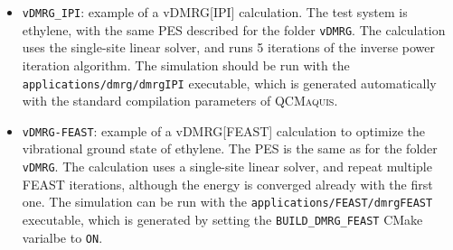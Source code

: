 \documentclass[bibliography=totoc,12pt,a4paper]{scrartcl}
\newcommand{\qcm}{\textsc{QCMaquis}}
\begin{document}
\begin{itemize}
 The calculation is initiated from the ONV associated with the ground-state wave function.
 The calculations should be run with the \texttt{applications/dmrg/dmrg} executable, which is automatically generated by each \qcm\ compilation configuration.
 \item \texttt{vDMRG\_IPI}: example of a vDMRG[IPI] calculation.
 The test system is ethylene, with the same PES described for the folder \texttt{vDMRG}.
 The calculation uses the single-site linear solver, and runs 5 iterations of the inverse power iteration algorithm.
 The simulation should be run with the \texttt{applications/dmrg/dmrgIPI} executable, which is generated automatically with the standard compilation parameters of \qcm.
 \item \texttt{vDMRG-FEAST}: example of a vDMRG[FEAST] calculation to optimize the vibrational ground state of ethylene.
 The PES is the same as for the folder \texttt{vDMRG}.
 The calculation uses a single-site linear solver, and repeat multiple FEAST iterations, although the energy is converged already with the first one.
 The simulation can be run with the \texttt{applications/FEAST/dmrgFEAST} executable, which is generated by setting the \texttt{BUILD\_DMRG\_FEAST} CMake varialbe to \texttt{ON}.                
\end{itemize}

\clearpage
\newpage


\end{document}
